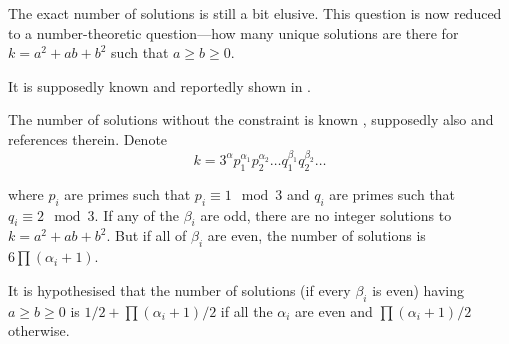 	The exact number of solutions is still a bit elusive. This question is now reduced to a number-theoretic question---how many unique solutions are there for $k=a^2+ab+b^2$ such that $a\geq b\geq 0$.
	
	It is supposedly known \cite{oeisA088534} and reportedly shown in \cite{berndt1992fitzroy}.

	The number of solutions without the constraint is known \cite{marmon2005hexagonal}, supposedly also \cite{hirschhorn2008fitzroy} and references therein. Denote
	\begin{equation}
		k=3^\alpha p_1^{\alpha_1}p_2^{\alpha_2}\ldots q_1^{\beta_1}q_2^{\beta_2}\ldots
	\end{equation}
	
	where $p_i$ are primes such that $p_i \equiv 1 \mod 3$ and $q_i$ are primes such that $q_i \equiv 2 \mod 3$. If any of the $\beta_i$ are odd, there are no integer solutions to $k=a^2+ab+b^2$. But if all of $\beta_i$ are even, the number of solutions is $6\prod (\alpha_i +1)$.
	
	It is hypothesised \cite{nair2004elementary} that the number of solutions (if every $\beta_i$ is even) having $a \geq b \geq 0$ is $1/2 + \prod (\alpha_i +1)/2$ if all the $\alpha_i$ are even and $\prod (\alpha_i +1)/2$ otherwise.
